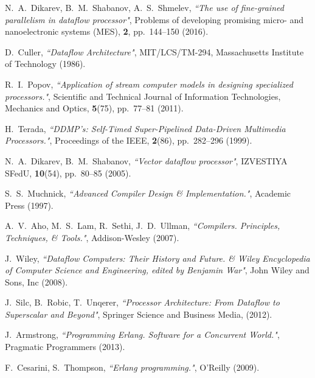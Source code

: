 \documentclass[
11pt,%
tightenlines,%
twoside,%
onecolumn,%
nofloats,%
nobibnotes,%
nofootinbib,%
superscriptaddress,%
noshowpacs,%
centertags]%
{revtex4}
\begin{document}
\begin{thebibliography}{99}

N.~A.~Dikarev, B.~M.~Shabanov, A.~S.~Shmelev, {\it ``The use of fine-grained parallelism in dataflow processor"}, Problems of developing promising micro- and nanoelectronic systems (MES), {\bf 2}, pp.~144--150 (2016).

D.~Culler, {\it ``Dataflow Architecture"}, MIT/LCS/TM-294, Massachusetts Institute of Technology (1986).

R.~I.~Popov, {\it ``Application of stream computer models in designing specialized processors."}, Scientific and Technical Journal of Information Technologies, Mechanics and Optics, {\bf 5}(75), pp.~77--81 (2011).

H.~Terada, {\it ``DDMP’s: Self-Timed Super-Pipelined Data-Driven Multimedia Processors."}, Proceedings of the IEEE, {\bf 2}(86), pp.~282--296 (1999).

N.~A.~Dikarev, B.~M.~Shabanov, {\it ``Vector dataflow processor"}, IZVESTIYA SFedU, {\bf 10}(54), pp.~80--85 (2005).

S.~S.~Muchnick, {\it ``Advanced Compiler Design \& Implementation."}, Academic Press (1997).

A.~V.~Aho, M.~S.~Lam, R.~Sethi, J.~D.~Ullman, {\it ``Compilers. Principles, Techniques, \& Tools."}, Addison-Wesley (2007).

J.~Wiley, {\it ``Dataflow Computers: Their History and Future. \& Wiley Encyclopedia of Computer Science and Engineering, edited by Benjamin War"}, John Wiley and Sons, Inc (2008).

J.~Silc, B.~Robic, T.~Unqerer, {\it ``Processor Architecture: From Dataflow to Superscalar and Beyond"}, Springer Science and Business Media, (2012).

J.~Armstrong, {\it ``Programming Erlang. Software for a Concurrent World."}, Pragmatic Programmers (2013).

F.~Cesarini, S.~Thompson, {\it ``Erlang programming."}, O'Reilly (2009).

\end{thebibliography}
\end{document}
